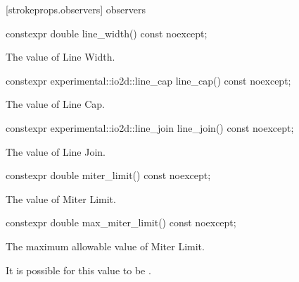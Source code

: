  [strokeprops.observers] { observers}

\begin{itemdecl}
constexpr double line_width() const noexcept;
\end{itemdecl}
\begin{itemdescr}
\pnum
\returns
The value of Line Width.
\end{itemdescr}

\begin{itemdecl}
constexpr experimental::io2d::line_cap line_cap() const noexcept;
\end{itemdecl}
\begin{itemdescr}
\pnum
\returns
The value of Line Cap.
\end{itemdescr}

\begin{itemdecl}
constexpr experimental::io2d::line_join line_join() const noexcept;
\end{itemdecl}
\begin{itemdescr}
\pnum
\returns
The value of Line Join.
\end{itemdescr}

\begin{itemdecl}
constexpr double miter_limit() const noexcept;
\end{itemdecl}
\begin{itemdescr}
\pnum
\returns
The value of Miter Limit.
\end{itemdescr}

\begin{itemdecl}
constexpr double max_miter_limit() const noexcept;
\end{itemdecl}
\begin{itemdescr}
\pnum
\returns
The  maximum allowable value of Miter Limit.

\pnum
\remarks
It is possible for this value to be .
\end{itemdescr}
